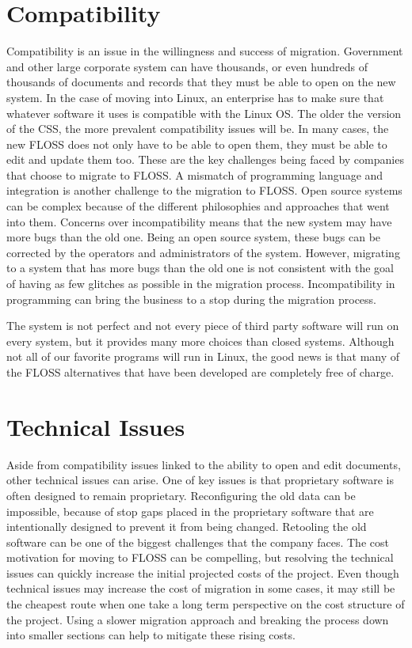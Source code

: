  \section{Compatibility}
  Compatibility is an issue in the willingness and success of migration. Government and other large corporate system can have thousands, or even hundreds of thousands of documents and records that they must be able to open on the new system. In the case of moving into Linux, an enterprise has to make sure that whatever software it uses is compatible with the Linux OS.
  The older the version of the CSS, the more prevalent compatibility issues will be. In many cases, the new FLOSS does not only have to be able to open them, they must be able to edit and update them too. These are the key challenges being faced by companies that choose to migrate to FLOSS. 
  A mismatch of programming language and integration is another challenge to the migration to FLOSS. Open source systems can be complex because of the different philosophies and approaches that went into them. Concerns over incompatibility means that the new system may have more bugs than the old one. Being an open source system, these bugs can be corrected by the operators and administrators of the system. However, migrating to a system that has more bugs than the old one is not consistent with the goal of having as few glitches as possible in the migration process. Incompatibility in programming can bring the business to a stop during the migration process. 

  The system is not perfect and not every piece of third party software will run on every system, but it provides many more choices than closed systems.
  Although not all of our favorite programs will run in Linux, the good news is that many of the FLOSS alternatives that have been developed are completely free of charge.


  \section{Technical Issues}
  Aside from compatibility issues linked to the ability to open and edit documents, other technical issues can arise. One of key issues is that proprietary software is often designed to remain proprietary. Reconfiguring the old data can be impossible, because of stop gaps placed in the proprietary software that are intentionally designed to prevent it from being changed. Retooling the old software can be one of the biggest challenges that the company faces. 
  The cost motivation for moving to FLOSS can be compelling, but resolving the technical issues can quickly increase the initial projected costs of the project. Even though technical issues may increase the cost of migration in some cases, it may still be the cheapest route when one take a long term perspective on the cost structure of the project. Using a slower migration approach and breaking the process down into smaller sections can help to mitigate these rising costs. 
	
